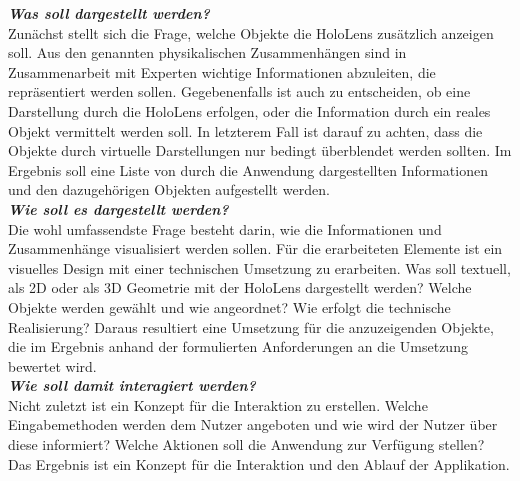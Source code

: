 \textbf{\textit{Was soll dargestellt werden?}}\\
Zunächst stellt sich die Frage, welche Objekte die HoloLens zusätzlich anzeigen soll. Aus den genannten physikalischen Zusammenhängen sind in Zusammenarbeit mit Experten wichtige Informationen abzuleiten, die repräsentiert werden sollen. Gegebenenfalls ist auch zu entscheiden, ob eine Darstellung durch die HoloLens erfolgen, oder die Information durch ein reales Objekt vermittelt werden soll. In letzterem Fall ist darauf zu achten, dass die Objekte durch virtuelle Darstellungen nur bedingt überblendet werden sollten.
\noindent\hspace*{5mm}
Im Ergebnis soll eine Liste von durch die Anwendung dargestellten Informationen und den dazugehörigen Objekten aufgestellt werden.\\

\textbf{\textit{Wie soll es dargestellt werden?}}\\
Die wohl umfassendste Frage besteht darin, wie die Informationen und Zusammenhänge visualisiert werden sollen. Für die erarbeiteten Elemente ist ein visuelles Design mit einer technischen Umsetzung zu erarbeiten. Was soll textuell, als 2D oder als 3D Geometrie mit der HoloLens dargestellt werden? Welche Objekte werden gewählt und wie angeordnet? Wie erfolgt die technische Realisierung?
\noindent\hspace*{5mm}
Daraus resultiert eine Umsetzung für die anzuzeigenden Objekte, die im Ergebnis anhand der formulierten Anforderungen an die Umsetzung bewertet wird.\\

\textbf{\textit{Wie soll damit interagiert werden?}}\\
Nicht zuletzt ist ein Konzept für die Interaktion zu erstellen. Welche Eingabemethoden werden dem Nutzer angeboten und wie wird der Nutzer über diese informiert? Welche Aktionen soll die Anwendung zur Verfügung stellen?
\noindent\hspace*{5mm}
Das Ergebnis ist ein Konzept für die Interaktion und den Ablauf der Applikation.
